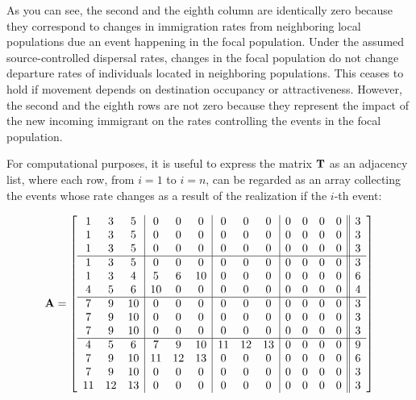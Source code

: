 As you can see, the second and the eighth column are identically zero because they correspond to changes in immigration rates from neighboring local populations due an event happening in the focal population. Under the assumed source-controlled dispersal rates, changes in the focal population do not change departure rates of individuals located in neighboring populations. This ceases to hold if movement depends on destination occupancy or attractiveness. However, the second and the eighth rows are not zero because they represent the impact of the new incoming immigrant on the rates controlling the events in the focal population.  

For computational purposes, it is useful to express the matrix ${\bf T}$ as an adjacency list, where each row, from $i=1$ to $i=n$, can be regarded as an array collecting the events whose rate changes as a result of the realization if the $i$-th event: 

\begin{equation}
{\bf A} = 
\left[ \begin{array}{ccc|ccc|ccc|cccc||c}
1 & 3 & 5   & 0 & 0 & 0  & 0 & 0 & 0  & 0 & 0 & 0 & 0 & 3\\
1 & 3 & 5   & 0 & 0 & 0  & 0 & 0 & 0  & 0 & 0 & 0 & 0 & 3\\
1 & 3 & 5   & 0 & 0 & 0  & 0 & 0 & 0  & 0 & 0 & 0 & 0 & 3\\
\hline
1 & 3 & 5   & 0  & 0 & 0   & 0 & 0 & 0  & 0 & 0 & 0 & 0 & 3\\
1 & 3 & 4   & 5  & 6 & 10  & 0 & 0 & 0  & 0 & 0 & 0 & 0 & 6\\
4 & 5 & 6   & 10 & 0 & 0   & 0 & 0 & 0  & 0 & 0 & 0 & 0 & 4\\
\hline
7 & 9 & 10  & 0 & 0 & 0  & 0 & 0 & 0  & 0 & 0 & 0 & 0 & 3\\
7 & 9 & 10  & 0 & 0 & 0  & 0 & 0 & 0  & 0 & 0 & 0 & 0 & 3\\
7 & 9 & 10  & 0 & 0 & 0  & 0 & 0 & 0  & 0 & 0 & 0 & 0 & 3\\
\hline
4  & 5  & 6   & 7  & 9  & 10  & 11 & 12 & 13  & 0 & 0 & 0 & 0 & 9\\
7  & 9  & 10  & 11 & 12 & 13  & 0 & 0 & 0     & 0 & 0 & 0 & 0 & 6\\
7  & 9  & 10  & 0  & 0  & 0   & 0 & 0 & 0     & 0 & 0 & 0 & 0 & 3\\
11 & 12 & 13  & 0  & 0  & 0   & 0 & 0 & 0     & 0 & 0 & 0 & 0 & 3\\
\end{array}
\right]
\label{A_E}
\end{equation}


